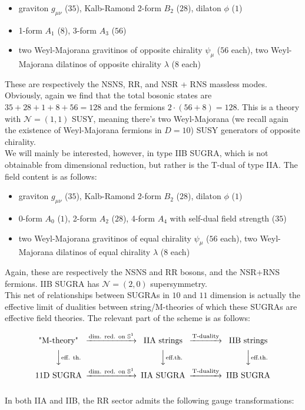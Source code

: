 \begin{itemize}
\item graviton $g_{\mu\nu}$ ($35$), Kalb-Ramond 2-form $B_2$ ($28$), dilaton $\phi$ ($1$)
\item 1-form $A_1$ ($8$), 3-form $A_3$ ($56$)
\item two Weyl-Majorana gravitinos of opposite chirality $\psi_\mu$ ($56$ each), two Weyl-Majorana dilatinos of opposite chirality $\lambda$ ($8$ each)
\end{itemize}

These are respectively the NSNS, RR, and NSR + RNS massless modes.\\

Obviously, again we find that the total bosonic states are $35+28+1+8+56 = 128$ and the fermions $2\cdot (56+8) = 128$. This is a theory with $\mathcal{N}=(1,1)$ SUSY, meaning there's two Weyl-Majorana (we recall again the existence of Weyl-Majorana fermions in $D=10$) SUSY generators of opposite chirality.\\

We will mainly be interested, however, in type IIB SUGRA, which is not obtainable from dimensional reduction, but rather is the T-dual of type IIA. The field content is as follows:

\begin{itemize}
\item graviton $g_{\mu\nu}$ ($35$), Kalb-Ramond 2-form $B_2$ ($28$), dilaton $\phi$ ($1$)
\item 0-form $A_0$ ($1$), 2-form $A_2$ ($28$), 4-form $A_4$ with self-dual field strength ($35$)
\item two Weyl-Majorana gravitinos of equal chirality $\psi_\mu$ ($56$ each), two Weyl-Majorana dilatinos of equal chirality $\lambda$ ($8$ each)
\end{itemize}

Again, these are respectively the NSNS and RR bosons, and the NSR+RNS fermions. IIB SUGRA has $\mathcal{N}=(2,0)$ supersymmetry.\\

This net of relationships between SUGRAs in $10$ and $11$ dimension is actually the effective limit of dualities between string/M-theories of which these SUGRAs are effective field theories. The relevant part of the scheme is as follows:

\[\begin{CD}
\text{"M-theory"}     @> \text{dim. red. on }\mathbb{S}^1>>  \text{IIA strings} @> \text{T-duality} >> \text{IIB strings} \\
@VV\text{eff. th.}V        @VV\text{eff.th.}V  @VV \text{eff.th.} V\\
\text{11D SUGRA}     @> \text{dim. red. on }\mathbb{S}^1>> \text{IIA SUGRA} @> \text{T-duality}>>  \text{IIB SUGRA}
\end{CD}\]
\\
In both IIA and IIB, the RR sector admits the following gauge transformations:

